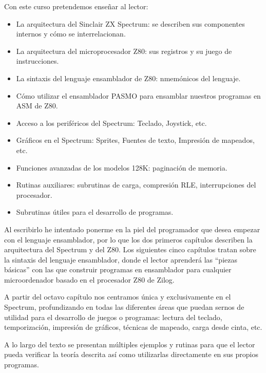 \documentclass[letterpaper,10pt,spanish]{sphinxmanual}
\begin{document}
Con este curso pretendemos enseñar al lector:
\begin{itemize}
\item {} 
La arquitectura del Sinclair ZX Spectrum: se describen sus componentes internos y cómo se interrelacionan.

\item {} 
La arquitectura del microprocesador Z80: sus registros y su juego de instrucciones.

\item {} 
La sintaxis del lenguaje ensamblador de Z80: nmemónicos del lenguaje.

\item {} 
Cómo utilizar el ensamblador PASMO para ensamblar nuestros programas en ASM de Z80.

\item {} 
Acceso a los periféricos del Spectrum: Teclado, Joystick, etc.

\item {} 
Gráficos en el Spectrum: Sprites, Fuentes de texto, Impresión de mapeados, etc.

\item {} 
Funciones avanzadas de los modelos 128K: paginación de memoria.

\item {} 
Rutinas auxiliares: subrutinas de carga, compresión RLE, interrupciones del procesador.

\item {} 
Subrutinas útiles para el desarrollo de programas.

\end{itemize}

Al escribirlo he intentado ponerme en la piel del programador que desea empezar con el lenguaje ensamblador, por lo que los dos primeros capítulos describen la arquitectura del Spectrum y del Z80. Los siguientes cinco capítulos tratan sobre la sintaxis del lenguaje ensamblador, donde el lector aprenderá las “piezas básicas” con las que construir programas en ensamblador para cualquier microordenador basado en el procesador Z80 de Zilog.

A partir del octavo capítulo nos centramos única y exclusivamente en el Spectrum, profundizando en todas las diferentes áreas que puedan sernos de utilidad para el desarrollo de juegos o programas: lectura del teclado, temporización, impresión de gráficos, técnicas de mapeado, carga desde cinta, etc.

A lo largo del texto se presentan múltiples ejemplos y rutinas para que el lector pueda verificar la teoría descrita así como utilizarlas directamente en sus propios programas.
\end{document}
